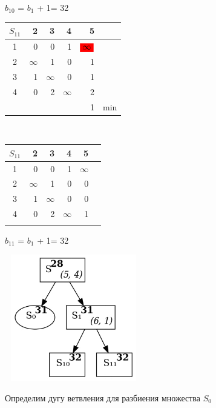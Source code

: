 \documentclass[12pt]{article}
\begin{document}
$b_{10}$ = $b_1$ + 1= 32

\begin{flushleft}
\begin{tabular}{c||rrrr||c}
$S_{11}$ & 2 & 3 & 4 & 5 & \\
\hline
\hline
1 &  0 & 0  & 1 & $\colorbox{red}{$\infty$}$ & \\
2 &  $\infty$ & 1  & 0 & 1 & \\
3 &  1 & $\infty$  & 0 & 1 & \\
4 &  0 & 2  & $\infty$ & 2 & \\
\hline
\hline
 &  &  &  &1 & min \\
\end{tabular}
$\qquad $  
\begin{tabular}{c||rrrr||c}
$S_{11}$ & 2 & 3 & 4 & 5 & \\
\hline
\hline
1 &  0 & 0  & 1 & $\infty$ & \\
2 &  $\infty$ & 1  & 0 & 0 & \\
3 &  1 & $\infty$  & 0 & 0 & \\
4 &  0 & 2  & $\infty$ & 1 & \\
\hline
\hline
 & &  &  & & \\
\end{tabular}
\end{flushleft}

$b_{11}$ = $b_1$ + 1= 32\\

\begin{flushleft}
 
\includegraphics[width = 6cm, height = 5.5cm]{pictures/picture_13.jpg}
\end{flushleft}
\vspace{6cm}
Определим дугу ветвления для разбиения множества $S_0$\\
\end{document}
